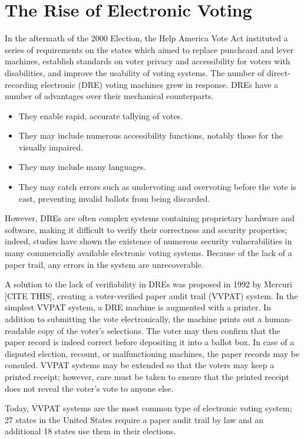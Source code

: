 \section{The Rise of Electronic Voting}

In the aftermath of the 2000 Election, the Help America Vote Act instituted a series of requirements on the states which aimed to replace punchcard and lever machines, establish standards on voter privacy and accessibility for voters with disabilities, and improve the usability of voting systems. The number of direct-recording electronic (DRE) voting machines grew in response. DREs have a number of advantages over their mechanical counterparts.

\begin{itemize}
\item They enable rapid, accurate tallying of votes.
\item They may include numerous accessibility functions, notably those for the visually impaired.
\item They may include many languages.
\item They may catch errors such as undervoting and overvoting before the vote is cast, preventing invalid ballots from being discarded.
\end{itemize}

However, DREs are often complex systems containing proprietary hardware and software, making it difficult to verify their correctness and security properties; indeed, studies have shown the existence of numerous security vulnerabilities in many commercially available electronic voting systems. Because of the lack of a paper trail, any errors in the system are unrecoverable.

A solution to the lack of verifiability in DREs was proposed in 1992 by Mercuri [CITE THIS], creating a voter-verified paper audit trail (VVPAT) system. In the simplest VVPAT system, a DRE machine is augmented with a printer. In addition to submitting the vote electronically, the machine prints out a human-readable copy of the voter's selections. The voter may then confirm that the paper record is indeed correct before depositing it into a ballot box. In case of a disputed election, recount, or malfunctioning machines, the paper records may be consuled. VVPAT systems may be extended so that the voters may keep a printed receipt; however, care must be taken to ensure that the printed receipt does not reveal the voter's vote to anyone else.

Today, VVPAT systems are the most common type of electronic voting system; 27 states in the United States require a paper audit trail by law and an additional 18 states use them in their elections.

